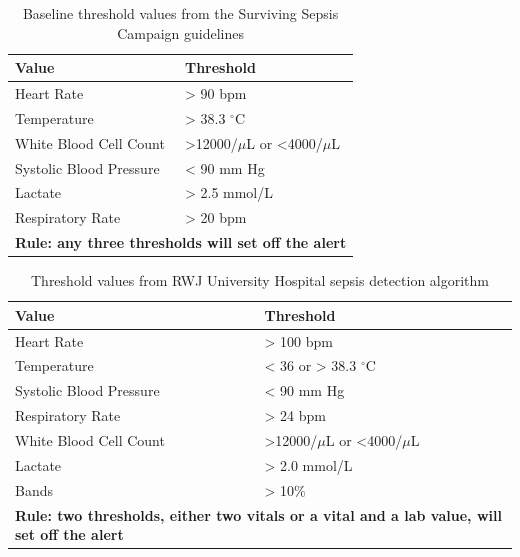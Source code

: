 \documentclass{sig-alternate}
\begin{document}
\begin{table}
\renewcommand{\arraystretch}{1.5}
  \begin{tabular}{| l | l |}
\hline

{\bf Value} & {\bf Threshold}\\ \hline
Heart Rate & > 90 bpm\\ \hline
Temperature & > 38.3 $^\circ$C\\ \hline
White Blood Cell Count & >12000/$\mu$L  or <4000/$\mu$L\\ \hline
Systolic Blood Pressure & < 90 mm Hg\\ \hline
Lactate & > 2.5 mmol/L\\ \hline
Respiratory Rate & > 20 bpm\\ \hline
 \multicolumn{2}{|p{7cm}|}{\bf Rule: any three thresholds will set off the alert} \\ \hline
 \end{tabular}
	\caption{Baseline threshold values from the Surviving Sepsis Campaign guidelines}
  \label{tab:threshold_table}
\end{table}

\begin{table}
\renewcommand{\arraystretch}{1.5}
  \begin{tabular}{| l | l |}
\hline

{\bf Value} & {\bf Threshold}\\ \hline
Heart Rate & > 100 bpm\\ \hline
Temperature & < 36 or > 38.3 $^\circ$C\\ \hline
Systolic Blood Pressure & < 90 mm Hg\\ \hline
Respiratory Rate & > 24 bpm\\ \hline \hline
White Blood Cell Count & >12000/$\mu$L  or <4000/$\mu$L\\ \hline
Lactate & > 2.0 mmol/L\\ \hline
Bands & > 10\% \\ \hline
 \multicolumn{2}{|p{7cm}|}{\bf Rule: two thresholds, either two vitals or a vital and a lab value, will set off the alert} \\ \hline

 \end{tabular}
	\caption{Threshold values from RWJ University Hospital sepsis detection algorithm}
  \label{tab:rwj_table}
\end{table}
\end{document}
